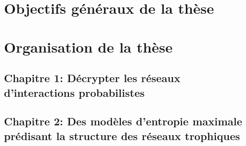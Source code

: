 
\section{Objectifs généraux de la thèse} 



\section{Organisation de la thèse}

\subsection{Chapitre 1: Décrypter les réseaux d'interactions probabilistes} 

\subsection{Chapitre 2: Des modèles d'entropie maximale prédisant la structure des réseaux trophiques} 

\endinput
